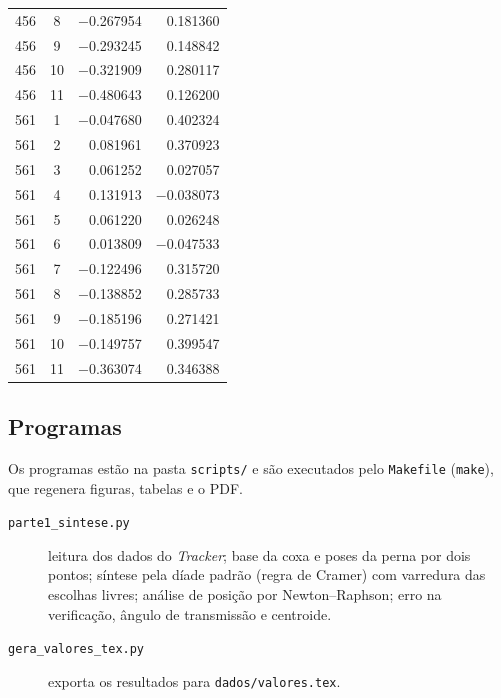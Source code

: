 \documentclass[12pt,a4paper,twoside]{article}
\numberwithin{equation}{section}
\begin{document}
{\begin{longtable}{cc rr}
    456 & 8 & \ensuremath{-}0.267954 & 0.181360 \\
    456 & 9 & \ensuremath{-}0.293245 & 0.148842 \\
    456 & 10 & \ensuremath{-}0.321909 & 0.280117 \\
    456 & 11 & \ensuremath{-}0.480643 & 0.126200 \\
    561 & 1 & \ensuremath{-}0.047680 & 0.402324 \\
    561 & 2 & 0.081961 & 0.370923 \\
    561 & 3 & 0.061252 & 0.027057 \\
    561 & 4 & 0.131913 & \ensuremath{-}0.038073 \\
    561 & 5 & 0.061220 & 0.026248 \\
    561 & 6 & 0.013809 & \ensuremath{-}0.047533 \\
    561 & 7 & \ensuremath{-}0.122496 & 0.315720 \\
    561 & 8 & \ensuremath{-}0.138852 & 0.285733 \\
    561 & 9 & \ensuremath{-}0.185196 & 0.271421 \\
    561 & 10 & \ensuremath{-}0.149757 & 0.399547 \\
    561 & 11 & \ensuremath{-}0.363074 & 0.346388 \\
\end{longtable}
}

\subsection{Programas}\label{ap:codigo}



Os programas estão na pasta \texttt{scripts/} e são executados pelo \texttt{Makefile}
(\texttt{make}), que regenera figuras, tabelas e o PDF.

\begin{description}
  \item[\texttt{parte1\_sintese.py}] leitura dos dados do \emph{Tracker}; base da coxa e poses
  da perna por dois pontos; síntese pela díade padrão (regra de Cramer) com varredura das
  escolhas livres; análise de posição por Newton--Raphson;
  erro na verificação, ângulo de transmissão e centroide.
  \item[\texttt{gera\_valores\_tex.py}] exporta os resultados para \texttt{dados/valores.tex}.
\end{description}




\clearpage
\printbibliography[heading=bibintoc,title={Referências}]
\end{document}
